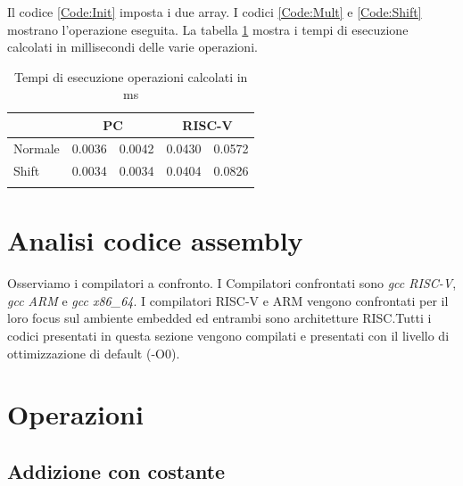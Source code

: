 \documentclass[12pt,a4paper]{report}
\begin{document}
Il codice \ref{Code:Init} imposta i due array.  I codici \ref{Code:Mult} e \ref{Code:Shift} mostrano l'operazione eseguita.
La tabella \ref{Tab:tempi_esecuzioneMS} mostra i tempi di esecuzione calcolati in millisecondi delle varie operazioni.

\begin{table}[h]
\centering
\begin{tabular}{lcccc}
\cline{2-5}
\multicolumn{1}{l|}{}         & \multicolumn{2}{c|}{PC}                                   & \multicolumn{2}{c|}{RISC-V}                               \\ \hline
\multicolumn{1}{|l|}{Normale} & \multicolumn{1}{c|}{0.0036} & \multicolumn{1}{c|}{0.0042} & \multicolumn{1}{c|}{0.0430} & \multicolumn{1}{c|}{0.0572} \\ \hline
\multicolumn{1}{|l|}{Shift}   & \multicolumn{1}{c|}{0.0034} & \multicolumn{1}{c|}{0.0034} & \multicolumn{1}{c|}{0.0404} & \multicolumn{1}{c|}{0.0826} \\ \hline
                              & \multicolumn{1}{l}{}        & \multicolumn{1}{l}{}        & \multicolumn{1}{l}{}        & \multicolumn{1}{l}{}       
\end{tabular}
	\label{Tab:tempi_esecuzioneMS}
	\caption{Tempi di esecuzione operazioni calcolati in ms}
\end{table}
	
	
\section{Analisi codice assembly}
Osserviamo i compilatori a confronto.  I Compilatori confrontati sono \textit{gcc RISC-V},  \textit{gcc ARM} e \textit{gcc x86\_64}.  I compilatori RISC-V e ARM vengono confrontati per il loro focus sul ambiente embedded ed entrambi sono architetture RISC.Tutti i codici presentati in questa sezione vengono compilati e presentati con il livello di ottimizzazione di default (-O0).


\section{Operazioni}
\subsection{Addizione con costante}


\end{document}

